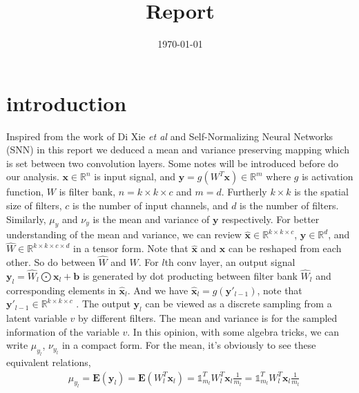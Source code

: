 \documentclass[]{article}
\title{Report} %
\date{\today} %
\begin{document}
\maketitle


\section{introduction}

Inspired from the work of Di Xie \emph{et al} \cite{Orthogonal_weights} and Self-Normalizing Neural Networks (SNN)\cite{SNNs} in this report we deduced a mean and variance preserving mapping which is set between two convolution layers. Some notes will be introduced before do our analysis. $\mathbf{x}\in\mathbb{R}^{n}$ is input signal, and $\mathbf{y}=g(W^{T}\mathbf{x})\in\mathbb{R}^{m}$ where $g$ is activation function, $W$ is filter bank, $n = k \times k \times c$ and $m = d$. Furtherly $k \times k$ is the spatial size of filters, $c$ is the number of input channels, and $d$ is the number of filters. Similarly, $\mu_y$ and $\nu_y$ is the mean and variance of $\mathbf{y}$ respectively. For better understanding of the mean and variance, we can review $\mathbf{\widehat{x}}\in\mathbb{R}^{k \times k \times c}$, $\mathbf{y}\in\mathbb{R}^{d}$, and $\widehat{W}\in\mathbb{R}^{k \times k \times c \times d}$ in a tensor form. Note that $\mathbf{\widehat{x}}$ and $ \mathbf{x}$ can be reshaped from each other. So do between $\widehat{W}$ and $W$. For $l$th conv layer, an output signal $\mathbf{y}_{l}=\widehat{W}_{l}\bigodot\mathbf{x}_{l}+\mathbf{b}$ is generated by dot producting between filter bank $\widehat{W}_{l}$ and corresponding elements in $\mathbf{\widehat{x}}_{l}$. And we have $\mathbf{\widehat{x}}_{l}=g(\mathbf{y}'_{l-1})$, note that $\mathbf{y}'_{l-1}\in\mathbb{R}^{k \times k \times c}$ . The output $\mathbf{y}_{l}$ can be viewed as a discrete sampling from a latent variable $v$ by different filters. The mean and variance is for the sampled information of the variable $v$. In this opinion, with some algebra tricks, we can write $\mu_{y_{l}}$, $\nu_{y_{l}}$ in a compact form.
For the mean, it's obviously to see these equivalent relations,
\begin{align}\label{mean}
&\mu_{y_{l}} = \mathbf{E}(\mathbf{y}_{l}) = \mathbf{E}(W_{l}^{T}\mathbf{x}_{l}) = \mathbb{1}_{m_l}^{T}W_{l}^{T}\mathbf{x}_{l}\frac{1}{m_l} = \mathbb{1}_{m_l}^{T}W_{l}^{T}\mathbf{x}_{l}\frac{1}{m_l}
\end{align}
\end{document}
